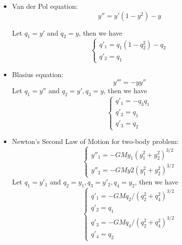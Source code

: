 \documentclass[11pt]{article}
\begin{document}
	\begin{itemize}
		\item Van der Pol equation: \[y'' = y'(1 - y^2) - y\]
		
		Let $q_1 = y'$ and $q_2 = y$, then we have
		\[\begin{cases}
			q'_1 = q_1(1 - q_2^2) - q_2\\
			q'_2 = q_1
		\end{cases} \]
		\item Blasius equation: \[y''' = -yy''\]
		Let $q_1 = y''$ and $q_2 = y', q_3 = y$, then we have
		\[\begin{cases}
			q'_1 = -q_3q_1\\
			q'_2 = q_1\\
			q'_3 = q_2
		\end{cases} \]
		
		\item Newton's Second Law of Motion for two-body problem: \[\begin{cases}
			y''_1 = -GMy_1(y_1^2 + y_2^2)^{3/2}\\
			y''_2 = -GMy2(y_1^2 + y_2^2)^{3/2}
		\end{cases} \]
		Let $q_1 = y'_1$ and $q_2 = y_1, q_3 = y'_2, q_4 = y_2$, then we have
		\[\begin{cases}
			q'_1 = -GMq_2/(q_2^2 + q_4^2)^{3/2}\\
			q'_2 = q_1\\
			q'_3 = -GMq_4/(q_2^2 + q_4^2)^{3/2}\\
			q'_4 = q_2
		\end{cases}
		\]
	\end{itemize}
\end{document}
